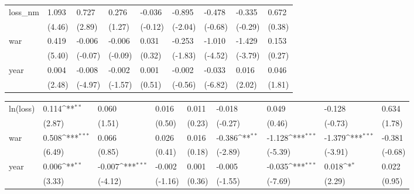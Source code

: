 \begin{tabular}{p{1.5cm} p{2cm} p{1.7cm} p{1.7cm} p{1.7cm} p{1.7cm} p{1.7cm} p{1.7cm} p{1.7cm}}
\hline
loss\_nm         &    1.093\sym{***}&    0.727\sym{**} &    0.276         &   -0.036         &   -0.895\sym{*}  &   -0.478         &   -0.335         &    0.672         \\
                &   (4.46)         &   (2.89)         &   (1.27)         &  (-0.12)         &  (-2.04)         &  (-0.68)         &  (-0.29)         &   (0.38)         \\
war             &    0.419\sym{***}&   -0.006         &   -0.006         &    0.031         &   -0.253         &   -1.010\sym{***}&   -1.429\sym{***}&    0.153         \\
                &   (5.40)         &  (-0.07)         &  (-0.09)         &   (0.32)         &  (-1.83)         &  (-4.52)         &  (-3.79)         &   (0.27)         \\
year            &    0.004\sym{*}  &   -0.008\sym{***}&   -0.002         &    0.001         &   -0.002         &   -0.033\sym{***}&    0.016\sym{*}  &    0.046         \\
                &   (2.48)         &  (-4.97)         &  (-1.57)         &   (0.51)         &  (-0.56)         &  (-6.82)         &   (2.02)         &   (1.81)         \\
\end{tabular}
\def\sym#1{\ifmmode^{#1}\else\(^{#1}\)\fi}
\begin{tabular}{p{1.5cm} p{2cm} p{1.7cm} p{1.7cm} p{1.7cm} p{1.7cm} p{1.7cm} p{1.7cm} p{1.7cm}}
\hline
ln(loss)        &    0.114\sym{**} &    0.060         &    0.016         &    0.011         &   -0.018         &    0.049         &   -0.128         &    0.634         \\
                &   (2.87)         &   (1.51)         &   (0.50)         &   (0.23)         &  (-0.27)         &   (0.46)         &  (-0.73)         &   (1.78)         \\
war             &    0.508\sym{***}&    0.066         &    0.026         &    0.016         &   -0.386\sym{**} &   -1.128\sym{***}&   -1.379\sym{***}&   -0.381         \\
                &   (6.49)         &   (0.85)         &   (0.41)         &   (0.18)         &  (-2.89)         &  (-5.39)         &  (-3.91)         &  (-0.68)         \\
year            &    0.006\sym{**} &   -0.007\sym{***}&   -0.002         &    0.001         &   -0.005         &   -0.035\sym{***}&    0.018\sym{*}  &    0.022         \\
                &   (3.33)         &  (-4.12)         &  (-1.16)         &   (0.36)         &  (-1.55)         &  (-7.69)         &   (2.29)         &   (0.95)         \\
\end{tabular}
